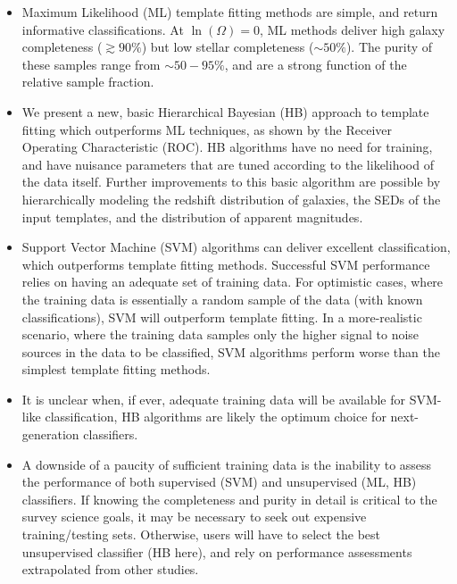 \documentclass[12pt,preprint]{aastex}
\begin{document}
\begin{itemize}

\item Maximum Likelihood (ML) template fitting methods are simple, and
  return informative classifications.  At $\ln(\Omega)=0$, ML methods
  deliver high galaxy completeness ($\gtrsim90\%$) but low stellar
  completeness ($\sim50\%$).  The purity of these samples range from
  $\sim50-95\%$, and are a strong function of the relative sample
  fraction.

\item We present a new, basic Hierarchical Bayesian (HB) approach to template
  fitting which outperforms ML techniques, as shown by the Receiver
  Operating Characteristic (ROC).  HB algorithms have no need for training, 
  and have nuisance parameters that are tuned according to the likelihood 
  of the data itself.  Further improvements to this basic algorithm are possible by
  hierarchically modeling the redshift distribution of galaxies, the
  SEDs of the input templates, and the distribution of apparent
  magnitudes.

\item Support Vector Machine (SVM) algorithms can deliver excellent
  classification, which outperforms template fitting methods.
  Successful SVM performance relies on having an adequate set of
  training data.  For optimistic cases, where the training data is
  essentially a random sample of the data (with known
  classifications), SVM will outperform template fitting.  In a
  more-realistic scenario, where the training data samples only the
  higher signal to noise sources in the data to be classified, SVM
  algorithms perform worse than the simplest template fitting methods.

\item It is unclear when, if ever, adequate training data
  will be available for SVM-like classification, HB algorithms are 
  likely the optimum choice for next-generation classifiers.

\item A downside of a paucity of sufficient training data is the
  inability to assess the performance of both supervised (SVM) and
  unsupervised (ML, HB) classifiers.  If knowing the completeness and
  purity in detail is critical to the survey science goals, it may be
  necessary to seek out expensive training/testing sets.  Otherwise,
  users will have to select the best unsupervised classifier (HB
  here), and rely on performance assessments extrapolated from other
  studies.


\end{itemize}
\end{document}
